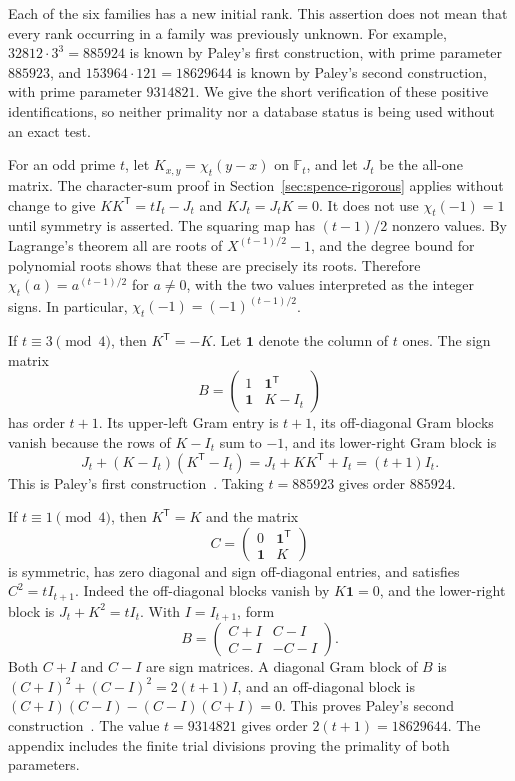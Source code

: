 \documentclass[10pt]{article}
\newcommand{\F}{\mathbb F}
\begin{document}
Each of the six families has a new initial rank. This assertion does not
mean that every rank occurring in a family was previously unknown.
For example, $32812\cdot3^3=885924$ is known by Paley's first construction,
with prime parameter $885923$, and
$153964\cdot121=18629644$ is known by Paley's second construction,
with prime parameter $9314821$. We give the short verification of these
positive identifications, so neither primality nor a database status is
being used without an exact test.

For an odd prime $t$, let $K_{x,y}=\chi_t(y-x)$ on $\F_t$, and let
$J_t$ be the all-one matrix. The character-sum proof in
Section~\ref{sec:spence-rigorous} applies without change to give
$KK^{\mathsf T}=tI_t-J_t$ and $KJ_t=J_tK=0$.
It does not use $\chi_t(-1)=1$ until symmetry is asserted.
The squaring map has $(t-1)/2$ nonzero values. By Lagrange's theorem
all are roots of $X^{(t-1)/2}-1$, and the degree bound for polynomial
roots shows that these are precisely its roots. Therefore
$\chi_t(a)=a^{(t-1)/2}$ for $a\ne0$, with the two values interpreted
as the integer signs. In particular,
$\chi_t(-1)=(-1)^{(t-1)/2}$.

If $t\equiv3\pmod4$, then $K^{\mathsf T}=-K$.
Let $\mathbf1$ denote the column of $t$ ones. The sign matrix
\[
 B=\begin{pmatrix}1&\mathbf1^{\mathsf T}\\
                  \mathbf1&K-I_t\end{pmatrix}
\]
has order $t+1$. Its upper-left Gram entry is $t+1$, its off-diagonal
Gram blocks vanish because the rows of $K-I_t$ sum to $-1$, and its
lower-right Gram block is
\[
 J_t+(K-I_t)(K^{\mathsf T}-I_t)
 =J_t+KK^{\mathsf T}+I_t=(t+1)I_t.
\]
This is Paley's first construction~\cite{paley}. Taking $t=885923$ gives order $885924$.

If $t\equiv1\pmod4$, then $K^{\mathsf T}=K$ and the matrix
\[
 C=\begin{pmatrix}0&\mathbf1^{\mathsf T}\\\mathbf1&K\end{pmatrix}
\]
is symmetric, has zero diagonal and sign off-diagonal entries, and
satisfies $C^2=tI_{t+1}$. Indeed the off-diagonal blocks vanish by
$K\mathbf1=0$, and the lower-right block is
$J_t+K^2=tI_t$. With $I=I_{t+1}$, form
\[
 B=\begin{pmatrix}C+I&C-I\\C-I&-C-I\end{pmatrix}.
\]
Both $C+I$ and $C-I$ are sign matrices. A diagonal Gram block of $B$
is $(C+I)^2+(C-I)^2=2(t+1)I$, and an off-diagonal block is
$(C+I)(C-I)-(C-I)(C+I)=0$. This proves Paley's second construction~\cite{paley}.
The value $t=9314821$ gives order $2(t+1)=18629644$.
The appendix includes the finite trial divisions proving the primality
of both parameters.
\end{document}

